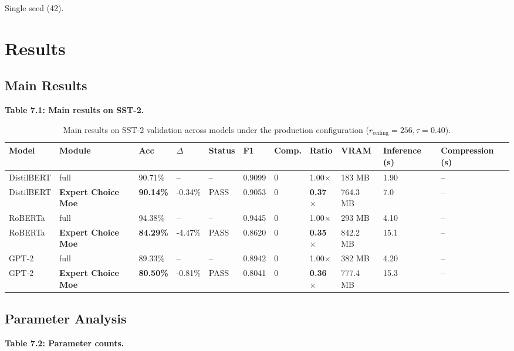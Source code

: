 Single seed (42).



\section{Results}

\subsection{Main Results}

\textbf{Table 7.1: Main results on SST-2.}

\begin{table}[t]
\centering
\small
\begin{tabular}{lllllllllll}
\toprule
\textbf{Model} & \textbf{Module} & \textbf{Acc} & \textbf{$\Delta$} & \textbf{Status} & \textbf{F1} & \textbf{Comp.} & \textbf{Ratio} & \textbf{VRAM} & \textbf{Inference (s)} & \textbf{Compression (s)} \\
\midrule
DistilBERT & full & 90.71\% & -- & -- & 0.9099 & 0 & 1.00$\times$ & 183 MB & 1.90 & -- \\
DistilBERT & \textbf{Expert Choice Moe} & \textbf{90.14\%} & -0.34\% & PASS & 0.9053 & 0 & \textbf{0.37$\times$} & 764.3 MB & 7.0 & -- \\
RoBERTa & full & 94.38\% & -- & -- & 0.9445 & 0 & 1.00$\times$ & 293 MB & 4.10 & -- \\
RoBERTa & \textbf{Expert Choice Moe} & \textbf{84.29\%} & -4.47\% & PASS & 0.8620 & 0 & \textbf{0.35$\times$} & 842.2 MB & 15.1 & -- \\
GPT-2 & full & 89.33\% & -- & -- & 0.8942 & 0 & 1.00$\times$ & 382 MB & 4.20 & -- \\
GPT-2 & \textbf{Expert Choice Moe} & \textbf{80.50\%} & -0.81\% & PASS & 0.8041 & 0 & \textbf{0.36$\times$} & 777.4 MB & 15.3 & -- \\
\bottomrule
\end{tabular}
\caption{Main results on SST-2 validation across models under the production configuration ($r_{\mathrm{ceiling}}=256, \tau=0.40$).}
\label{tab:main_sst2}
\end{table}

\subsection{Parameter Analysis}

\textbf{Table 7.2: Parameter counts.}

